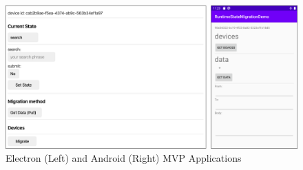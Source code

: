 \FloatBarrier
\begin{figure}[H]
    \includegraphics[width=\linewidth]{../figures/mvp.png}
    \centering
    \caption{Electron (Left) and Android (Right) MVP Applications}
    \label{fig:mvp}
\end{figure}
\FloatBarrier

% 

